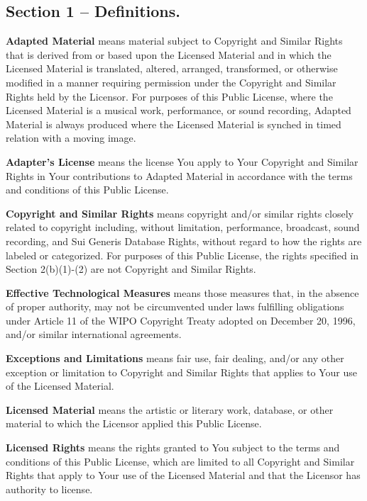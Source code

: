 \documentclass[12pt,a4paper]{article}
\begin{document}
\subsection*{Section 1 – Definitions.}

\begin{description}
\setlength{\itemsep}{0cm}
\item[a] {\bf Adapted Material} means material subject to Copyright and Similar Rights that is derived from or based upon the Licensed Material and in which the Licensed Material is translated, altered, arranged, transformed, or otherwise modified in a manner requiring permission under the Copyright and Similar Rights held by the Licensor. For purposes of this Public License, where the Licensed Material is a musical work, performance, or sound recording, Adapted Material is always produced where the Licensed Material is synched in timed relation with a moving image.
\item[b] {\bf Adapter's License} means the license You apply to Your Copyright and Similar Rights in Your contributions to Adapted Material in accordance with the terms and conditions of this Public License.
\item[c] {\bf Copyright and Similar Rights} means copyright and/or similar rights closely related to copyright including, without limitation, performance, broadcast, sound recording, and Sui Generis Database Rights, without regard to how the rights are labeled or categorized. For purposes of this Public License, the rights specified in Section 2(b)(1)-(2) are not Copyright and Similar Rights.
\item[d] {\bf Effective Technological Measures} means those measures that, in the absence of proper authority, may not be circumvented under laws fulfilling obligations under Article 11 of the WIPO Copyright Treaty adopted on December 20, 1996, and/or similar international agreements.
\item[e] {\bf Exceptions and Limitations} means fair use, fair dealing, and/or any other exception or limitation to Copyright and Similar Rights that applies to Your use of the Licensed Material.
\item[f] {\bf Licensed Material} means the artistic or literary work, database, or other material to which the Licensor applied this Public License.
\item[g] {\bf Licensed Rights} means the rights granted to You subject to the terms and conditions of this Public License, which are limited to all Copyright and Similar Rights that apply to Your use of the Licensed Material and that the Licensor has authority to license.

\end{description}
\end{document}

